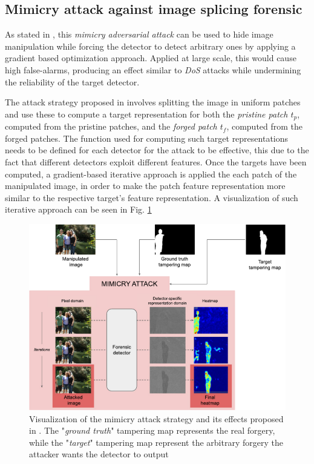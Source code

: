 \documentclass[conference]{IEEEtran} %
\begin{document}
    \subsection{Mimicry attack against image splicing forensic}
        As stated in \cite{boato2024adversarial}, this \textit{mimicry adversarial attack} can be used to hide image manipulation while forcing the detector to detect arbitrary ones by applying a gradient based optimization approach. Applied at large scale, this would cause high false-alarms, producing an effect similar to \textit{DoS} attacks while undermining the reliability of the target detector.

        The attack strategy proposed in \cite{boato2024adversarial} involves splitting the image in uniform patches and use these to compute a target representation for both the \textit{pristine patch $t_p$}, computed from the pristine patches, and the \textit{forged patch $t_f$}, computed from the forged patches. The function used for computing such target representations needs to be defined for each detector for the attack to be effective, this due to the fact that different detectors exploit different features. Once the targets have been computed, a gradient-based iterative approach is applied the each patch of the manipulated image, in order to make the patch feature representation more similar to the respective target's feature representation. A visualization of such iterative approach can be seen in Fig. \ref{fig:mim_visual}

        \begin{figure}[h]
            \centering
            \includegraphics[width=0.8\linewidth]{Img/mim_visual.png}
            \caption{Visualization of the mimicry attack strategy and its effects proposed in \cite{boato2024adversarial}. The "\textit{ground truth}" tampering map represents the real forgery, while the "\textit{target}" tampering map represent the arbitrary forgery the attacker wants the detector to output}
            \label{fig:mim_visual}
        \end{figure}
\end{document}
